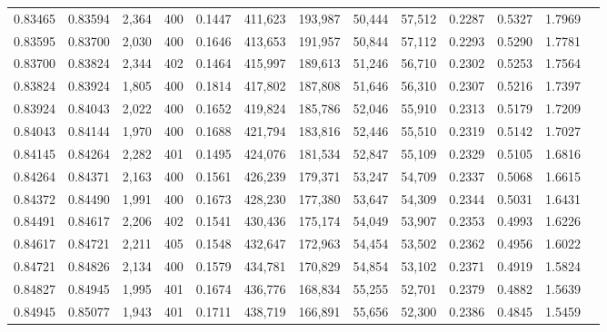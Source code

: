 \begin{tabular}{rrrrrrrrrrrrr}
0.83465 & 0.83594 & 2,364 & 400 &                                     0.1447 & 411,623 & 193,987 &  50,444 &  57,512 & 0.2287 & 0.5327 & 1.7969 \\
0.83595 & 0.83700 & 2,030 & 400 &                                     0.1646 & 413,653 & 191,957 &  50,844 &  57,112 & 0.2293 & 0.5290 & 1.7781 \\
0.83700 & 0.83824 & 2,344 & 402 &                                     0.1464 & 415,997 & 189,613 &  51,246 &  56,710 & 0.2302 & 0.5253 & 1.7564 \\
0.83824 & 0.83924 & 1,805 & 400 &                                     0.1814 & 417,802 & 187,808 &  51,646 &  56,310 & 0.2307 & 0.5216 & 1.7397 \\
0.83924 & 0.84043 & 2,022 & 400 &                                     0.1652 & 419,824 & 185,786 &  52,046 &  55,910 & 0.2313 & 0.5179 & 1.7209 \\
0.84043 & 0.84144 & 1,970 & 400 &                                     0.1688 & 421,794 & 183,816 &  52,446 &  55,510 & 0.2319 & 0.5142 & 1.7027 \\
0.84145 & 0.84264 & 2,282 & 401 &                                     0.1495 & 424,076 & 181,534 &  52,847 &  55,109 & 0.2329 & 0.5105 & 1.6816 \\
0.84264 & 0.84371 & 2,163 & 400 &                                     0.1561 & 426,239 & 179,371 &  53,247 &  54,709 & 0.2337 & 0.5068 & 1.6615 \\
0.84372 & 0.84490 & 1,991 & 400 &                                     0.1673 & 428,230 & 177,380 &  53,647 &  54,309 & 0.2344 & 0.5031 & 1.6431 \\
0.84491 & 0.84617 & 2,206 & 402 &                                     0.1541 & 430,436 & 175,174 &  54,049 &  53,907 & 0.2353 & 0.4993 & 1.6226 \\
0.84617 & 0.84721 & 2,211 & 405 &                                     0.1548 & 432,647 & 172,963 &  54,454 &  53,502 & 0.2362 & 0.4956 & 1.6022 \\
0.84721 & 0.84826 & 2,134 & 400 &                                     0.1579 & 434,781 & 170,829 &  54,854 &  53,102 & 0.2371 & 0.4919 & 1.5824 \\
0.84827 & 0.84945 & 1,995 & 401 &                                     0.1674 & 436,776 & 168,834 &  55,255 &  52,701 & 0.2379 & 0.4882 & 1.5639 \\
0.84945 & 0.85077 & 1,943 & 401 &                                     0.1711 & 438,719 & 166,891 &  55,656 &  52,300 & 0.2386 & 0.4845 & 1.5459 \\

\end{tabular}
